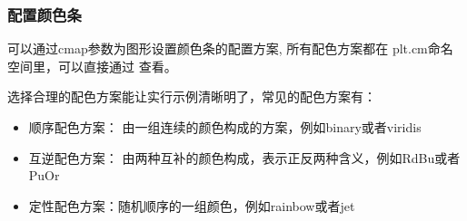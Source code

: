 \documentclass[letterpaper,10pt,english]{sphinxhowto}
\begin{document}


\subsubsection{配置颜色条}
\label{\detokenize{_u56fe_u5f62_u7b80_u5355_u7ed8_u5236:id11}}
可以通过cmap参数为图形设置颜色条的配置方案, 所有配色方案都在
plt.cm命名空间里，可以直接通过 查看。

选择合理的配色方案能让实行示例清晰明了，常见的配色方案有：
\begin{itemize}
\item {} 
顺序配色方案： 由一组连续的颜色构成的方案，例如binary或者viridis

\item {} 
互逆配色方案： 由两种互补的颜色构成，表示正反两种含义，例如RdBu或者PuOr

\item {} 
定性配色方案：随机顺序的一组颜色，例如rainbow或者jet

\end{itemize}

%
\begin{sphinxVerbatim}[commandchars=\\\{\}]
   
    \PYG{p}{[} \PYG{p}{]}

 
\end{sphinxVerbatim}

%
\begin{sphinxVerbatim}[commandchars=\\\{\}]
  
\end{sphinxVerbatim}

\end{document}

